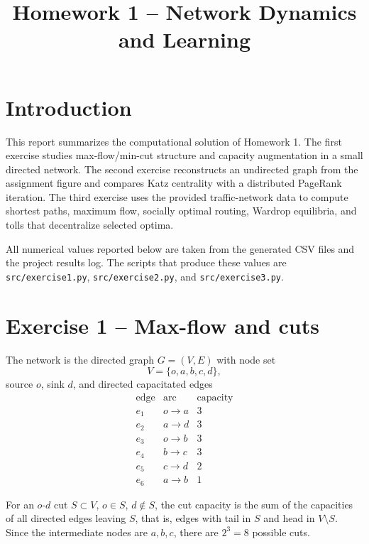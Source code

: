\documentclass[11pt,a4paper]{article}
\title{Homework 1 -- Network Dynamics and Learning}
\author{}
\date{}
\begin{document}
\maketitle

\section{Introduction}

This report summarizes the computational solution of Homework 1. The first
exercise studies max-flow/min-cut structure and capacity augmentation in a
small directed network. The second exercise reconstructs an undirected graph
from the assignment figure and compares Katz centrality with a distributed
PageRank iteration. The third exercise uses the provided traffic-network data
to compute shortest paths, maximum flow, socially optimal routing, Wardrop
equilibria, and tolls that decentralize selected optima.

All numerical values reported below are taken from the generated CSV files and
the project results log. The scripts that produce these values are
\texttt{src/exercise1.py}, \texttt{src/exercise2.py}, and
\texttt{src/exercise3.py}.

\section{Exercise 1 -- Max-flow and cuts}

The network is the directed graph \(G=(V,E)\) with node set
\[
V=\{o,a,b,c,d\},
\]
source \(o\), sink \(d\), and directed capacitated edges
\[
\begin{array}{c|c|c}
\text{edge} & \text{arc} & \text{capacity}\\
\hline
e_1 & o\to a & 3\\
e_2 & a\to d & 3\\
e_3 & o\to b & 3\\
e_4 & b\to c & 3\\
e_5 & c\to d & 2\\
e_6 & a\to b & 1
\end{array}
\]

For an \(o\)-\(d\) cut \(S\subset V\), \(o\in S\), \(d\notin S\), the cut
capacity is the sum of the capacities of all directed edges leaving \(S\),
that is, edges with tail in \(S\) and head in \(V\setminus S\). Since the
intermediate nodes are \(a,b,c\), there are \(2^3=8\) possible cuts.
\end{document}
